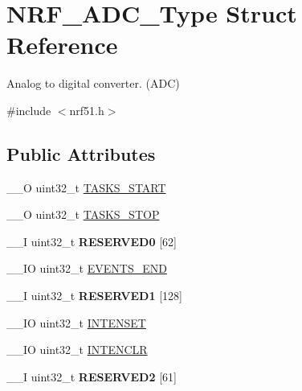 \hypertarget{struct_n_r_f___a_d_c___type}{}\section{N\+R\+F\+\_\+\+A\+D\+C\+\_\+\+Type Struct Reference}
\label{struct_n_r_f___a_d_c___type}


Analog to digital converter. (A\+D\+C)  




{\ttfamily \#include $<$nrf51.\+h$>$}

\subsection*{Public Attributes}
\begin{DoxyCompactItemize}
\item 
\+\_\+\+\_\+\+O uint32\+\_\+t \hyperlink{struct_n_r_f___a_d_c___type_a4e1d7d796a6c191984c87c7dd437359a}{T\+A\+S\+K\+S\+\_\+\+S\+T\+A\+R\+T}
\item 
\+\_\+\+\_\+\+O uint32\+\_\+t \hyperlink{struct_n_r_f___a_d_c___type_ab26ea43addd8c5ee09f04982593a5df7}{T\+A\+S\+K\+S\+\_\+\+S\+T\+O\+P}
\item 
\hypertarget{struct_n_r_f___a_d_c___type_a473faa0f058f27fd3ac71060e41ceee0}{}\+\_\+\+\_\+\+I uint32\+\_\+t {\bfseries R\+E\+S\+E\+R\+V\+E\+D0} \mbox{[}62\mbox{]}\label{struct_n_r_f___a_d_c___type_a473faa0f058f27fd3ac71060e41ceee0}

\item 
\+\_\+\+\_\+\+I\+O uint32\+\_\+t \hyperlink{struct_n_r_f___a_d_c___type_a0704426ec4a45908c723de1a80939142}{E\+V\+E\+N\+T\+S\+\_\+\+E\+N\+D}
\item 
\hypertarget{struct_n_r_f___a_d_c___type_a8fe59daf4234efa4df5e4d55b6799ee2}{}\+\_\+\+\_\+\+I uint32\+\_\+t {\bfseries R\+E\+S\+E\+R\+V\+E\+D1} \mbox{[}128\mbox{]}\label{struct_n_r_f___a_d_c___type_a8fe59daf4234efa4df5e4d55b6799ee2}

\item 
\+\_\+\+\_\+\+I\+O uint32\+\_\+t \hyperlink{struct_n_r_f___a_d_c___type_a857f6b106c3d0e4da0aef2a6c3add283}{I\+N\+T\+E\+N\+S\+E\+T}
\item 
\+\_\+\+\_\+\+I\+O uint32\+\_\+t \hyperlink{struct_n_r_f___a_d_c___type_a40a29363b34f3ef6ca9378347aca8cee}{I\+N\+T\+E\+N\+C\+L\+R}
\item 
\hypertarget{struct_n_r_f___a_d_c___type_a9772e9cd07ee865ad4277d0c709e1320}{}\+\_\+\+\_\+\+I uint32\+\_\+t {\bfseries R\+E\+S\+E\+R\+V\+E\+D2} \mbox{[}61\mbox{]}\label{struct_n_r_f___a_d_c___type_a9772e9cd07ee865ad4277d0c709e1320}


\end{DoxyCompactItemize}

